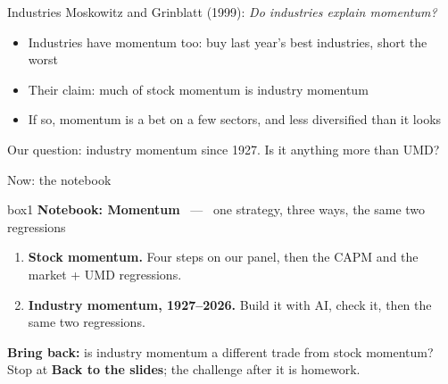 \documentclass[aspectratio=169,10pt]{beamer}
\begin{document}
\begin{frame}{Industries}
Moskowitz and Grinblatt (1999): \emph{Do industries explain momentum?}
\vskip 10pt
\begin{itemize}
\item Industries have momentum too: buy last year's best industries, short the worst
\vskip 10pt
\item Their claim: much of stock momentum is industry momentum
\vskip 10pt
\item If so, momentum is a bet on a few sectors, and less diversified than it looks
\end{itemize}
\vskip 14pt
\centering Our question: industry momentum since 1927. Is it anything more than UMD?
\end{frame}

\begin{frame}{Now: the notebook}
\vskip 2pt
\begin{beamercolorbox}[rounded=true,sep=7pt,center]{box1}
\textbf{Notebook: Momentum} \ --- \ one strategy, three ways, the same two regressions
\end{beamercolorbox}
\vskip 10pt
\begin{enumerate}
\item \textbf{Stock momentum.} Four steps on our panel, then the CAPM and the market + UMD regressions.
\vskip 5pt
\item \textbf{Industry momentum, 1927--2026.} Build it with AI, check it, then the same two regressions.
\end{enumerate}
\vskip 8pt
{\small \textbf{Bring back:} is industry momentum a different trade from stock momentum? \\[2pt]
Stop at \textbf{Back to the slides}; the challenge after it is homework.}
\end{frame}
\end{document}
